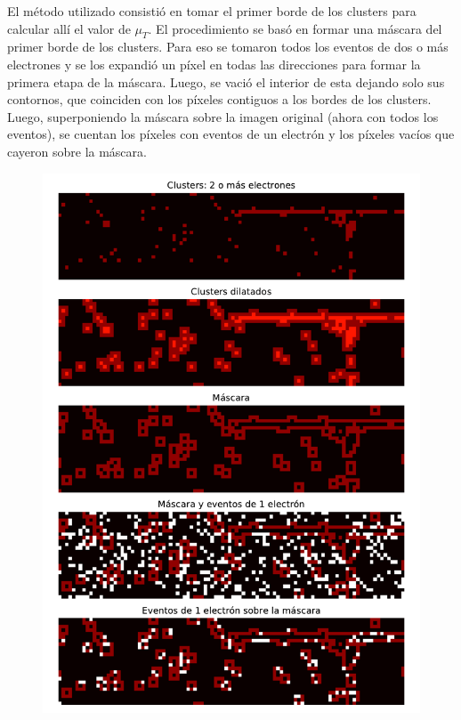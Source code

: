 El método utilizado consistió en tomar el primer borde de los clusters para calcular allí el valor de $\mu_{T}$. El procedimiento se basó en formar una máscara del primer borde de los clusters. Para eso se tomaron todos los eventos de dos o más electrones y se los expandió un píxel en todas las direcciones para formar la primera etapa de la máscara. Luego, se vació el interior de esta dejando solo sus contornos, que coinciden con los píxeles contiguos a los bordes de los clusters. Luego, superponiendo la máscara sobre la imagen original (ahora con todos los eventos), se cuentan los píxeles con eventos de un electrón y los píxeles vacíos que cayeron sobre la máscara. 
\begin{figure}[H]
    \centering
    \includegraphics[scale=0.65]{Figs/analisis_bordes.pdf}

\end{figure}
